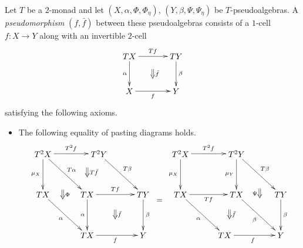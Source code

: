 \begin{Defi}
Let $T$ be a $2$-monad and let $(X,\alpha,\Phi,\Phi_\eta)$, $(Y,\beta,\Psi,\Psi_\eta)$ be $T$-pseudoalgebras. A \textit{pseudomorphism} $(f, \bar{f})$ between these pseudoalgebras consists of a $1$-cell $f \colon X \rightarrow Y$ along with an invertible $2$-cell
    \[
        \xy
            (0,0)*+{TX}="00";
            (20,0)*+{TY}="10";
            (0,-15)*+{X}="01";
            (20,-15)*+{Y}="11";
            {\ar^{Tf} "00" ; "10"};
            {\ar^{\beta} "10" ; "11"};
            {\ar_{\alpha} "00" ; "01"};
            {\ar_{f} "01" ; "11"};
            {\ar@{=>}^{\bar{f}} (10,-5.5) ; (10,-9.5)};
        \endxy
    \]
satisfying the following axioms.
    \begin{itemize}
        \item The following equality of pasting diagrams holds.
                \[
        \xy
            (5,0)*+{T^2X}="t3xl";
            (29,0)*+{T^2Y}="t2xl1";
            (5,-17.5)*+{TX}="t2xl2";
            (24,-35)*+{TX}="txl1";
            (48,-17.5)*+{TY}="txl2";
            (48,-35)*+{Y}="xl";
            (24,-17.5)*+{TX}="t2xl3";
            {\ar^{T^2f} "t3xl" ; "t2xl1"};
            {\ar^{T\beta} "t2xl1" ; "txl2"};
            {\ar^{\beta} "txl2" ; "xl"};
            {\ar_{\mu_X} "t3xl" ; "t2xl2"};
            {\ar_{\alpha} "t2xl2" ; "txl1"};
            {\ar_{f} "txl1" ; "xl"};
            {\ar^{T\alpha} "t3xl" ; "t2xl3"};
            {\ar^{Tf} "t2xl3" ; "txl2"};
            {\ar_{\alpha} "t2xl3" ; "txl1"};
            {\ar@{=>}^{T\bar{f}} (24,-6) ; (24,-10)};
            {\ar@{=>}^{\bar{f}} (36,-24) ; (36,-28)};
            {\ar@{=>}^{\Phi} (13.5,-15.5) ; (13.5,-19.5)};
            (64,0)*+{T^2X}="t3xr";
            (88,0)*+{T^2Y}="t2xr1";
            (64,-17.5)*+{TX}="t2xr2";
            (83,-35)*+{TX}="txr1";
            (107,-17.5)*+{TY}="txr2";
            (107,-35)*+{Y}="xr";
            (88,-17.5)*+{TX}="txr3";
            {\ar^{T^2f} "t3xr" ; "t2xr1"};
            {\ar^{T\beta} "t2xr1" ; "txr2"};
            {\ar^{\beta} "txr2" ; "xr"};
            {\ar_{\mu_{X}} "t3xr" ; "t2xr2"};
            {\ar_{\alpha} "t2xr2" ; "txr1"};
            {\ar_{f} "txr1" ; "xr"};
            {\ar_{Tf} "t2xr2" ; "txr3"};
            {\ar_{\beta} "txr3" ; "xr"};
            {\ar_{\mu_Y} "t2xr1" ; "txr3"};
            {\ar@{=>}_{\Psi} (98,-15) ; (98,-19)};
            {\ar@{=>}^{\bar{f}} (85,-24) ; (85,-28)};
            {\ar@{=} (54,-20) ; (56,-20)};
        \endxy
\]
\end{itemize}
\end{Defi}
